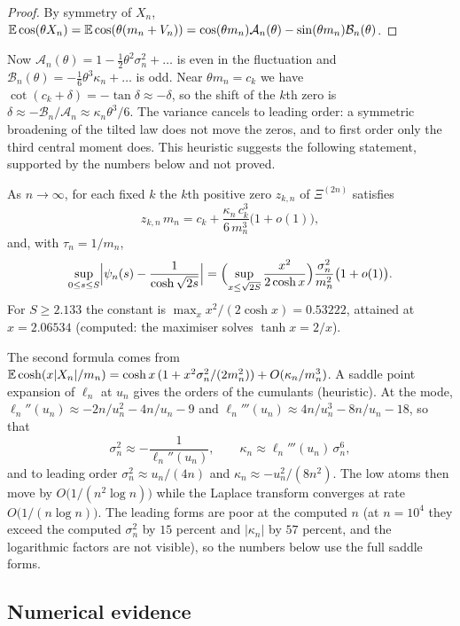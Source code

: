 \begin{proof}
By symmetry of $X_n$, $\mathbb{E}\cos(\theta X_n)=\mathbb{E}\cos(\theta(m_n+V_n))=\cos(\theta m_n)\mathcal A_n(\theta)-\sin(\theta m_n)\mathcal B_n(\theta)$.
\end{proof}

Now $\mathcal A_n(\theta)=1-\tfrac12\theta^2\sigma_n^2+\dots$ is even in the fluctuation and $\mathcal B_n(\theta)=-\tfrac16\theta^3\kappa_n+\dots$ is odd. Near $\theta m_n=c_k$ we have $\cot(c_k+\delta)=-\tan\delta\approx-\delta$, so the shift of the $k$th zero is $\delta\approx-\mathcal B_n/\mathcal A_n\approx\kappa_n\theta^3/6$. The variance cancels to leading order: a symmetric broadening of the tilted law does not move the zeros, and to first order only the third central moment does. This heuristic suggests the following statement, supported by the numbers below and not proved.

\begin{remark}\label{ki:conj:rate}
As $n\to\infty$, for each fixed $k$ the $k$th positive zero $z_{k,n}$ of $\Xi^{(2n)}$ satisfies
\[
z_{k,n}\,m_n=c_k+\frac{\kappa_n\,c_k^3}{6\,m_n^3}\bigl(1+o(1)\bigr),
\]
and, with $\tau_n=1/m_n$,
\[
\sup_{0\le s\le S}\Bigl|\psi_n(s)-\frac{1}{\cosh\sqrt{2s}}\Bigr|=\Bigl(\sup_{x\le\sqrt{2S}}\frac{x^2}{2\cosh x}\Bigr)\frac{\sigma_n^2}{m_n^2}\bigl(1+o(1)\bigr).
\]
For $S\ge2.133$ the constant is $\max_xx^2/(2\cosh x)=0.53222$, attained at $x=2.06534$ (computed: the maximiser solves $\tanh x=2/x$).
\end{remark}

The second formula comes from $\mathbb{E}\cosh(x|X_n|/m_n)=\cosh x\,(1+x^2\sigma_n^2/(2m_n^2))+O(\kappa_n/m_n^3)$. A saddle point expansion of $\ell_n$ at $u_n$ gives the orders of the cumulants (heuristic). At the mode, $\ell_n''(u_n)\approx-2n/u_n^2-4n/u_n-9$ and $\ell_n'''(u_n)\approx4n/u_n^3-8n/u_n-18$, so that
\[
\sigma_n^2\approx-\frac1{\ell_n''(u_n)},\qquad\kappa_n\approx\ell_n'''(u_n)\,\sigma_n^6,
\]
and to leading order $\sigma_n^2\approx u_n/(4n)$ and $\kappa_n\approx-u_n^2/(8n^2)$. The low atoms then move by $O\bigl(1/(n^2\log n)\bigr)$ while the Laplace transform converges at rate $O\bigl(1/(n\log n)\bigr)$. The leading forms are poor at the computed $n$ (at $n=10^4$ they exceed the computed $\sigma_n^2$ by $15$ percent and $|\kappa_n|$ by $57$ percent, and the logarithmic factors are not visible), so the numbers below use the full saddle forms.

\subsection{Numerical evidence}\label{ki:sec:numbers}


